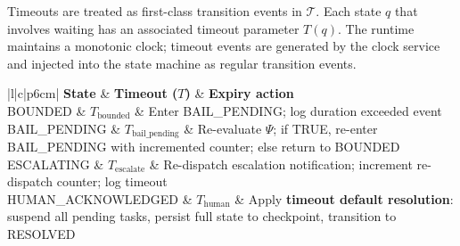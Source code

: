 \begin{algorithm}[H]
Timeouts are treated as first-class transition events in $\mathcal{T}$.  Each
state $q$ that involves waiting has an associated timeout parameter
$T(q)$.  The runtime maintains a monotonic clock; timeout events are
generated by the clock service and injected into the state machine as
regular transition events.

\bigskip

\begin{center}
\begin{tabular}{|l|c|p{6cm}|}
\hline
\textbf{State} & \textbf{Timeout ($T$)} & \textbf{Expiry action} \\ \hline
BOUNDED & $T_\text{bounded}$ & Enter BAIL\_PENDING; log duration exceeded event \\ \hline
BAIL\_PENDING & $T_\text{bail\_pending}$ & Re-evaluate $\Psi$; if TRUE, re-enter BAIL\_PENDING
with incremented counter; else return to BOUNDED \\ \hline
ESCALATING & $T_\text{escalate}$ & Re-dispatch escalation notification;
increment re-dispatch counter; log timeout \\ \hline
HUMAN\_ACKNOWLEDGED & $T_\text{human}$ & Apply \textbf{timeout default resolution}:
suspend all pending tasks, persist full state to checkpoint, transition to RESOLVED \\ \hline
\end{tabular}
\end{center}

\bigskip

\bigskip

\begin{center}
\end{center}


\end{algorithm}
